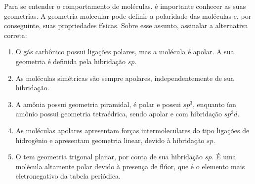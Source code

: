 Para se entender o comportamento de moléculas, é importante conhecer as suas geometrias. A geometria molecular pode definir a polaridade das moléculas e, por conseguinte, suas propriedades físicas. Sobre esse assunto, assinalar a alternativa correta: 

\begin{enumerate}[label = (\alph*)]	
	\item O gás carbônico possui ligações polares, mas a molécula é apolar. A sua geometria é definida pela hibridação $sp$. 
	\item As moléculas simétricas são sempre apolares, independentemente de sua hibridação.
	\item A amônia possui geometria piramidal, é polar e possui $sp^3$, enquanto íon amônio possui geometria tetraédrica, sendo apolar e com hibridação $sp^3d$.
	\item As moléculas apolares apresentam forças intermoleculares do tipo ligações de hidrogênio e apresentam geometria linear, devido à hibridação $sp$.
	\item  O  tem geometria trigonal planar, por conta de sua hibridação $sp$. É uma molécula altamente polar devido à presença de flúor, que é o elemento mais eletronegativo da tabela periódica. 
\end{enumerate}
